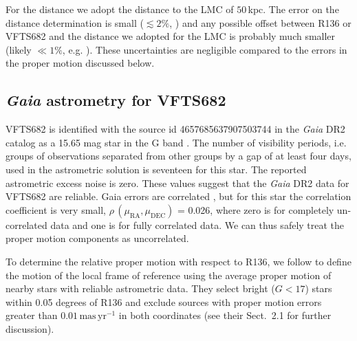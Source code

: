 \documentclass[apjl,twocolumn]{emulateapj}
\newcommand{\SdM}[1]{{{\color{brown}{#1}}}}
\newcommand{\Msun}{{\,\mathrm{M}_\odot}}
\newcommand{\masyr}{\,\mathrm{mas}\,\mathrm{yr}^{-1}}
\begin{document}



For the distance we adopt the distance to the LMC of $50$\,kpc. The error on the distance determination is small ($\lesssim2\%$, \citealt{pietrzynski:13}) and any possible offset between  R136 or VFTS682  and the distance we adopted for the LMC is probably much smaller (likely $\ll 1\%$, e.g. \citealt{Luks+1992}). These uncertainties are negligible compared to the errors in the proper motion discussed below.  




\subsection{ \emph{Gaia} astrometry for VFTS682\label{data:gaia}}



VFTS682 is identified with the source id 4657685637907503744 in the
\emph{Gaia} DR2 catalog  as a 15.65 mag star in the G band
\citep{gaia:16,brown:18}.   The number of visibility periods,
i.e. groups of observations separated from other groups by a gap of at
least four days, used in the astrometric solution is seventeen for this
star. The reported astrometric excess noise is zero.  These values
suggest that the \emph{Gaia} DR2  data for VFTS682 are
reliable. Gaia errors are correlated \citep[][]{lindengren:18}, but for this star the correlation coefficient is very small, $\rho\,(\mu_\mathrm{RA}, \mu_\mathrm{DEC})$  = 0.026, where zero is for completely un-correlated data and one is for fully correlated data. We can thus safely treat the proper motion components as uncorrelated.

To determine the relative proper motion with respect to R136, we follow  \citet{lennon:18} to define the motion of the local frame of reference using the average proper motion of nearby stars with reliable astrometric data.  They select  bright ($G<17$) stars within 0.05 degrees of R136 and exclude sources with proper motion errors greater than $0.01\masyr$ in both coordinates (see their  Sect.~2.1 for further discussion).  
\end{document}
